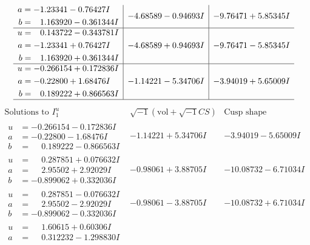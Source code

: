 \documentclass[1p]{elsarticle_modified}
\theoremstyle{definition}
\newcommand{\I}{\sqrt{-1}}
\begin{document}
$$\begin{array}{c|c|c}
\begin{aligned}
a &= -1.23341 - 0.76427 I \\
b &= \phantom{-}1.163920 - 0.361344 I\end{aligned}
 & -4.68589 - 0.94693 I & -9.76471 + 5.85345 I \\ \hline\begin{aligned}
u &= \phantom{-}0.143722 - 0.343781 I \\
a &= -1.23341 + 0.76427 I \\
b &= \phantom{-}1.163920 + 0.361344 I\end{aligned}
 & -4.68589 + 0.94693 I & -9.76471 - 5.85345 I \\ \hline\begin{aligned}
u &= -0.266154 + 0.172836 I \\
a &= -0.22800 + 1.68476 I \\
b &= \phantom{-}0.189222 + 0.866563 I\end{aligned}
 & -1.14221 - 5.34706 I & -3.94019 + 5.65009 I\\
 \hline 
 \end{array}$$\newpage$$\begin{array}{c|c|c}  
\text{Solutions to }I^u_{1}& \I (\text{vol} + \sqrt{-1}CS) & \text{Cusp shape}\\
 \hline 
\begin{aligned}
u &= -0.266154 - 0.172836 I \\
a &= -0.22800 - 1.68476 I \\
b &= \phantom{-}0.189222 - 0.866563 I\end{aligned}
 & -1.14221 + 5.34706 I & -3.94019 - 5.65009 I \\ \hline\begin{aligned}
u &= \phantom{-}0.287851 + 0.076632 I \\
a &= \phantom{-}2.95502 + 2.92029 I \\
b &= -0.899062 + 0.332036 I\end{aligned}
 & -0.98061 + 3.88705 I & -10.08732 - 6.71034 I \\ \hline\begin{aligned}
u &= \phantom{-}0.287851 - 0.076632 I \\
a &= \phantom{-}2.95502 - 2.92029 I \\
b &= -0.899062 - 0.332036 I\end{aligned}
 & -0.98061 - 3.88705 I & -10.08732 + 6.71034 I \\ \hline\begin{aligned}
u &= \phantom{-}1.60615 + 0.60306 I \\
a &= \phantom{-}0.312232 - 1.298830 I \\

\end{aligned}
\end{array}$$
\end{document}
